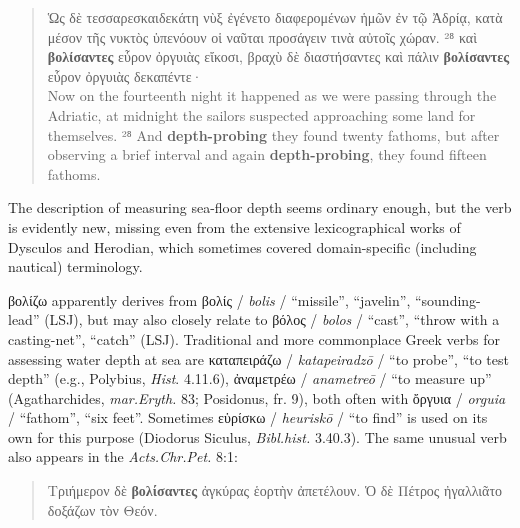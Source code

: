 \begin{small}
{\begin{quote} Ὡς δὲ τεσσαρεσκαιδεκάτη νὺξ ἐγένετο διαφερομένων ἡμῶν ἐν τῷ Ἀδρίᾳ, %
κατὰ μέσον τῆς νυκτὸς ὑπενόουν οἱ ναῦται προσάγειν τινὰ αὐτοῖς χώραν. %
²⁸ καὶ \textbf{βολίσαντες} εὗρον ὀργυιὰς εἴκοσι, %
βραχὺ δὲ διαστήσαντες καὶ πάλιν \textbf{βολίσαντες} εὗρον ὀργυιὰς δεκαπέντε· \\[1mm]
Now on the fourteenth night it happened as we were passing through the Adriatic, %
at midnight the sailors suspected approaching some land for themselves. %
²⁸ And \textbf{depth-probing} they found twenty fathoms, %
but after observing a brief interval and again \textbf{depth-probing}, they found fifteen fathoms. %
\end{quote} %
\vspace*{1mm}
\noindent{}The description of measuring sea-floor depth seems ordinary enough, %
but the verb is evidently new, missing even from the extensive lexicographical works of Dysculos and Herodian, %
which sometimes covered domain-specific (including nautical) terminology. %

βολίζω apparently derives from βολίς / \textit{bolis} / “missile”, “javelin”, “sounding-lead” (LSJ), %
but may also closely relate to βόλος / \textit{bolos} / “cast”, “throw with a casting-net”, “catch” (LSJ). %
Traditional and more commonplace Greek verbs for assessing water depth at sea are καταπειράζω / \textit{katapeiradzō} / “to probe”, “to test depth” %
(e.g., Polybius, \textit{Hist}. 4.11.6), ἀναμετρέω / \textit{anametreō} / “to measure up” %
(Agatharchides, \textit{mar.Eryth.} 83; Posidonus, fr. 9), both often with ὄργυια / \textit{orguia} / “fathom”, “six feet”. 
Sometimes εὑρίσκω / \textit{heuriskō} / “to find” is used on its own for this purpose (Diodorus Siculus, \textit{Bibl.hist.} 3.40.3). %
The same unusual verb also appears in the \textit{Acts.Chr.Pet.} 8:1: %

\vspace*{1mm} 
 \begin{quote}Τριήμερον δὲ \textbf{βολίσαντες} ἀγκύρας ἑορτὴν ἀπετέλουν. %
 Ὁ δὲ Πέτρος ἠγαλλιᾶτο δοξάζων τὸν Θεόν. \\[1mm] %
 \end{quote} %
\vspace*{1mm} 

}
\end{small}
